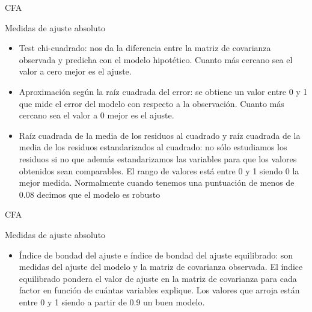 \documentclass[10pt]{beamer}
\begin{document}
\begin{frame}[fragile]{CFA}
\vspace{10px}
\begin{block}{Medidas de ajuste absoluto}
	\begin{itemize}
		\item Test chi-cuadrado: nos da la diferencia entre la matriz de covarianza observada y predicha con el modelo hipotético. Cuanto más cercano sea el valor a cero mejor es el ajuste.
		\item Aproximación según la raíz cuadrada del error: se obtiene un valor entre 0 y 1 que mide el error del modelo con respecto a la observación. Cuanto más cercano sea el valor a 0 mejor es el ajuste.
		\item Raíz cuadrada de la media de los residuos al cuadrado y raíz cuadrada de la media de los residuos estandarizados al cuadrado: no sólo estudiamos los residuos si no que además estandarizamos las variables para que los valores obtenidos sean comparables. El rango de valores está entre 0 y 1 siendo 0 la mejor medida. Normalmente cuando tenemos una puntuación de menos de 0.08 decimos que el modelo es robusto
	\end{itemize}
\end{block}
\end{frame}

\begin{frame}[fragile]{CFA}
\vspace{10px}
\begin{block}{Medidas de ajuste absoluto}
	\begin{itemize}
		\item Índice de bondad del ajuste e índice de bondad del ajuste equilibrado: son medidas del ajuste del modelo y la matriz de covarianza observada. El índice equilibrado pondera el valor de ajuste en la matriz de covarianza para cada factor en función de cuántas variables explique. Los valores que arroja están entre 0 y 1 siendo a partir de 0.9 un buen modelo.
	\end{itemize}
\end{block}
\end{frame}
\end{document}
